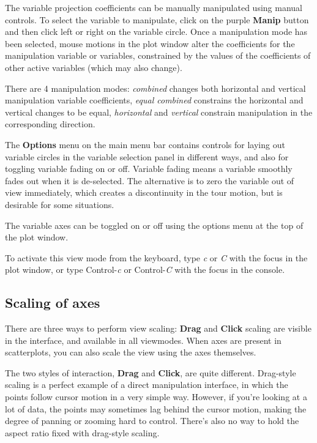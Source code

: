 \documentclass[11pt]{article}
\begin{document}
The variable projection coefficients can be manually manipulated using
manual controls. To select the variable to manipulate, click on the purple
{\bf Manip} button and then click left or right on the variable circle.
Once a manipulation mode has been selected, mouse motions in the plot
window alter the coefficients for the manipulation variable or variables,
constrained by the values of the coefficients of other active variables
(which may also change).

There are 4 manipulation modes: {\it combined} changes both horizontal
and vertical manipulation variable coefficients, {\it equal combined}
constrains the horizontal and vertical changes to be equal, {\it
horizontal} and {\it vertical} constrain manipulation in the corresponding
direction.

The {\bf Options} menu on the main menu bar contains controls for
laying out variable circles in the variable selection panel in
different ways, and also for toggling variable fading on or
off. Variable fading means a variable smoothly fades out when it is
de-selected. The alternative is to zero the variable out of view
immediately, which creates a discontinuity in the tour motion, but is
desirable for some situations.

The variable axes can be toggled on or off using the options menu at
the top of the plot window.

To activate this view mode from the keyboard, type {\em c} or {\em C}
with the focus in the plot window, or type Control-{\em c} or
Control-{\em C} with the focus in the console.

\subsection{Scaling of axes}
\label{slbl:Scaling}

There are three ways to perform view scaling:  {\bf Drag} and {\bf Click}
scaling are visible in the interface, and available in all viewmodes.
When axes are present in scatterplots, you can also scale the
view using the axes themselves.

The two styles of interaction, {\bf Drag} and {\bf Click}, are quite
different.  Drag-style scaling is a perfect example of a direct
manipulation interface, in which the points follow cursor motion in a
very simple way.  However, if you're looking at a lot of data, the
points may sometimes lag behind the cursor motion, making the degree
of panning or zooming hard to control.  There's also no way to
hold the aspect ratio fixed with drag-style scaling.
\end{document}
